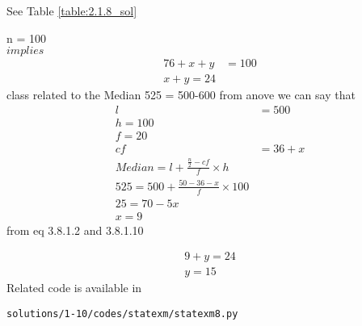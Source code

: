 See Table \ref{table:2.1.8_sol}
 \begin{table}[!ht]
	\centering
	
	\caption{}
\label{table:2.1.8_sol}
\end{table}

n = 100
\\
$implies$
\begin{align}
76 + x + y &= 100
\\
x+y = 24
\end{align}
class related to the Median 525 = 500-600
from anove we can say that 
\\
\begin{align}
l &= 500
\\
h = 100
\\
f= 20
\\
cf &= 36+x
\\
Median = l + \frac{\frac{n}{2} - cf}{f}\times h
\\
525 =  500 + \frac{50-36-x}{f}\times 100
\\
25 = 70-5x
\\
x = 9
\end{align}
from eq 3.8.1.2 and 3.8.1.10

\begin{align}
9 + y = 24
\\
y= 15
\end{align}
Related code is available in 
\begin{lstlisting}
solutions/1-10/codes/statexm/statexm8.py
\end{lstlisting}
